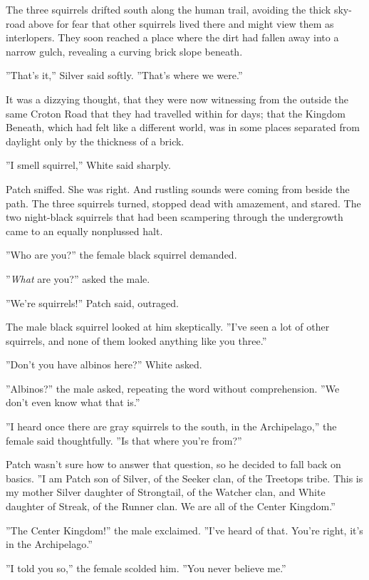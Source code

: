 \documentclass[12pt]{book}
\begin{document}
The three squirrels drifted south along the human trail, avoiding the thick sky-road above for fear that other squirrels lived there and might view them as interlopers. They soon reached a place where the dirt had fallen away into a narrow gulch, revealing a curving brick slope beneath.

''That's it,'' Silver said softly. ''That's where we were.''

It was a dizzying thought, that they were now witnessing from the outside the same Croton Road that they had travelled within for days; that the Kingdom Beneath, which had felt like a different world, was in some places separated from daylight only by the thickness of a brick.

''I smell squirrel,'' White said sharply.

Patch sniffed. She was right. And rustling sounds were coming from beside the path. The three squirrels turned, stopped dead with amazement, and stared. The two night-black squirrels that had been scampering through the undergrowth came to an equally nonplussed halt.

''Who are you?'' the female black squirrel demanded.

''{\it What} are you?'' asked the male.

''We're squirrels!'' Patch said, outraged.

The male black squirrel looked at him skeptically. ''I've seen a lot of other squirrels, and none of them looked anything like you three.''

''Don't you have albinos here?'' White asked.

''Albinos?'' the male asked, repeating the word without comprehension. ''We don't even know what that is.''

''I heard once there are gray squirrels to the south, in the Archipelago,'' the female said thoughtfully. ''Is that where you're from?''

Patch wasn't sure how to answer that question, so he decided to fall back on basics. ''I am Patch son of Silver, of the Seeker clan, of the Treetops tribe. This is my mother Silver daughter of Strongtail, of the Watcher clan, and White daughter of Streak, of the Runner clan. We are all of the Center Kingdom.''

''The Center Kingdom!'' the male exclaimed. ''I've heard of that. You're right, it's in the Archipelago.''

''I told you so,'' the female scolded him. ''You never believe me.''
\end{document}
